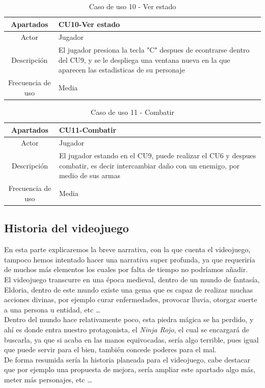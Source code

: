 \documentclass[a4paper]{article}
\begin{document}
\begin{table}[ht]
    \centering
    \begin{tabular}{|c|p{14cm}|} 
        \hline
        \textbf{Apartados}       & \textbf{CU10-Ver estado} \\
        \hline
        Actor                    & Jugador \\
        \hline
        Descripción              & El jugador presiona la tecla "C" despues de econtrarse dentro del CU9, y se le despliega una ventana nueva en la que aparecen las estadisticas de su personaje \\
        \hline
        Frecuencia de uso        & Media \\
        \hline
    \end{tabular}
    \caption{Caso de uso 10 - Ver estado}
    \label{tab:casosdeuso-table}
\end{table}

\begin{table}[ht]
    \centering
    \begin{tabular}{|c|p{14cm}|} 
        \hline
        \textbf{Apartados}       & \textbf{CU11-Combatir} \\
        \hline
        Actor                    & Jugador \\
        \hline
        Descripción              & El jugador estando en el CU9, puede realizar el CU6 y despues combatir, es decir intercambiar daño con un enemigo, por medio de sus armas \\
        \hline
        Frecuencia de uso        & Media \\
        \hline
    \end{tabular}
    \caption{Caso de uso 11 - Combatir}
    \label{tab:casosdeuso-table}
\end{table}

\clearpage
\subsection{Historia del videojuego}
En esta parte explicaremos la breve narrativa, con la que cuenta el videojuego, tampoco hemos intentado hacer una narrativa super profunda, ya que requeriría de muchos más elementos
los cuales por falta de tiempo no podríamos añadir.\\
El videojuego transcurre en una época medieval, dentro de un mundo de fantasía, Eldoria, dentro de este mundo existe una gema que es capaz de realizar muchas acciones divinas, por ejemplo
curar enfermedades, provocar lluvia, otorgar suerte a una persona u entidad, etc \dots \\
Dentro del mundo hace relativamente poco, esta piedra mágica se ha perdido, y ahí es donde entra nuestro protagonista, el \textit{Ninja Rojo}, el cual se encargará de buscarla, ya que
si acaba en las manos equivocadas, sería algo terrible, pues igual que puede servir para el bien, también concede poderes para el mal.\\
De forma resumida sería la historia planeada para el videojuego, cabe destacar que por ejemplo una propuesta de mejora, sería ampliar este apartado algo más, meter más personajes, etc \dots
\end{document}
